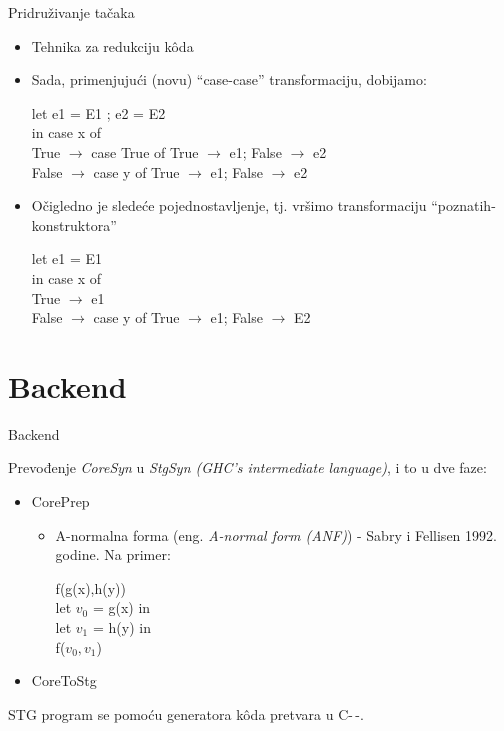 \documentclass{beamer}
\begin{document}
\begin{frame}[fragile]{Pridruživanje tačaka}
	\begin{itemize}
		\item Tehnika za redukciju k\^{o}da\\
		
		\item Sada, primenjujući (novu) “case-case” transformaciju, dobijamo:
		\begin{block}{}
			let e1 = E1 ; e2 = E2 \\
			in case x of \\
			True $ \rightarrow $ case True of {True $ \rightarrow $ e1; False $ \rightarrow $ e2} \\
			False $ \rightarrow $ case y of {True $ \rightarrow $ e1; False $ \rightarrow $ e2}
		\end{block}
		
		\item Očigledno je sledeće pojednostavljenje, tj. vršimo transformaciju “poznatih-konstruktora”
		\begin{block}{}
			let e1 = E1 \\
			in case x of \\
			True $ \rightarrow $ e1 \\
			False $ \rightarrow $ case y of {True $ \rightarrow $ e1; False $ \rightarrow $ E2}
		\end{block}
	\end{itemize}
\end{frame}

\section{Backend}

\begin{frame}{Backend}

	Prevođenje \textit{CoreSyn} u \textit{StgSyn (GHC’s intermediate language)}, i to u dve faze:
	\begin{itemize}
		\item CorePrep 
			\begin{itemize}
				\item A-normalna forma (eng. \emph{A-normal form (ANF)}) -  Sabry i Fellisen 1992. godine.
				Na primer:
				\begin{block}{}
					f(g(x),h(y))\\
					let $ v_{0} $ = g(x) in \\
					let $ v_{1} $ = h(y) in  \\
					f($ v_{0}, v_{1} $) 
				\end{block}
				
			\end{itemize} 
		\item CoreToStg
	\end{itemize}
	
	\vspace{0.5cm}
	
	STG program se pomoću generatora k\^{o}da pretvara u C-\,-.
\end{frame}
\end{document}
